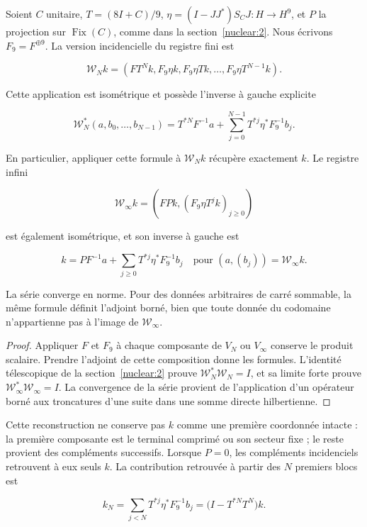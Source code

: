 Soient \(C\) unitaire, \(T=(8I+C)/9\), \(\eta=(I-JJ^*)S_CJ:H\to H^9\), et \(P\) la projection sur \(\operatorname{Fix}(C)\), comme dans la section~\ref{nuclear:2}. Nous écrivons \(F_9=F^{\oplus9}\). La version incidencielle du registre fini est

\[
\mathcal W_Nk=\left(FT^Nk,F_9\eta k,F_9\eta Tk,\ldots,F_9\eta T^{N-1}k\right).
\]

\begin{theorem}
Cette application est isométrique et possède l’inverse à gauche explicite

\[
\mathcal W_N^*(a,b_0,\ldots,b_{N-1})
=T^{*N}F^{-1}a+
\sum_{j=0}^{N-1}T^{*j}\eta^*F_9^{-1}b_j.
\]

En particulier, appliquer cette formule à \(\mathcal W_Nk\) récupère exactement \(k\). Le registre infini

\[
\mathcal W_\infty k=\left(FPk,(F_9\eta T^jk)_{j\ge0}\right)
\]

est également isométrique, et son inverse à gauche est

\[
k=PF^{-1}a+\sum_{j\ge0}T^{*j}\eta^*F_9^{-1}b_j
\quad\text{pour }(a,(b_j))=\mathcal W_\infty k.
\]

La série converge en norme. Pour des données arbitraires de carré sommable, la même formule définit l’adjoint borné, bien que toute donnée du codomaine n’appartienne pas à l’image de \(\mathcal W_\infty\).
\end{theorem}

\begin{proof}
Appliquer \(F\) et \(F_9\) à chaque composante de \(V_N\) ou \(V_\infty\) conserve le produit scalaire. Prendre l’adjoint de cette composition donne les formules. L’identité télescopique de la section~\ref{nuclear:2} prouve \(\mathcal W_N^*\mathcal W_N=I\), et sa limite forte prouve \(\mathcal W_\infty^*\mathcal W_\infty=I\). La convergence de la série provient de l’application d’un opérateur borné aux troncatures d’une suite dans une somme directe hilbertienne.

\end{proof}

Cette reconstruction ne conserve pas \(k\) comme une première coordonnée intacte : la première composante est le terminal comprimé ou son secteur fixe ; le reste provient des compléments successifs. Lorsque \(P=0\), les compléments incidenciels retrouvent à eux seuls \(k\). La contribution retrouvée à partir des \(N\) premiers blocs est

\[
k_N=\sum_{j<N}T^{*j}\eta^*F_9^{-1}b_j
=\bigl(I-T^{*N}T^N\bigr)k.
\]

